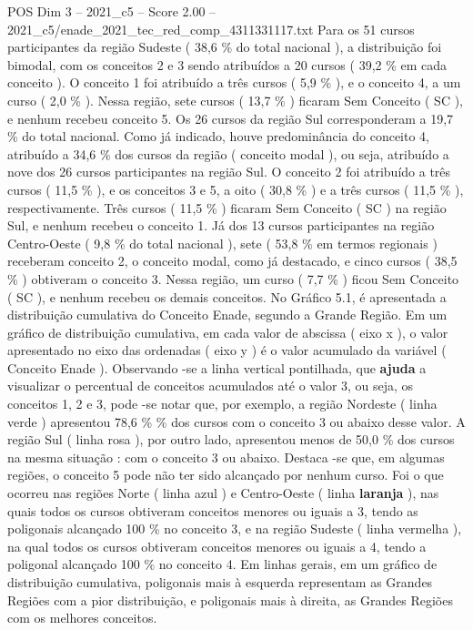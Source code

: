 \begin{textsample}{POS Dim 3 – 2021\_c5 – Score 2.00 – 2021\_c5/enade\_2021\_tec\_red\_comp\_4311331117.txt}
Para os 51 cursos participantes da região Sudeste ( 38,6 \% do total nacional ), a distribuição foi bimodal, com os conceitos 2 e 3 sendo atribuídos a 20 cursos ( 39,2 \% em cada conceito ).
O conceito 1 foi atribuído a três cursos ( 5,9 \% ), e o conceito 4, a um curso ( 2,0 \% ).
Nessa região, sete cursos ( 13,7 \% ) ficaram Sem Conceito ( SC ), e nenhum recebeu conceito 5.
Os 26 cursos da região Sul corresponderam a 19,7 \% do total nacional.
Como já indicado, houve predominância do conceito 4, atribuído a 34,6 \% dos cursos da região ( conceito modal ), ou seja, atribuído a nove dos 26 cursos participantes na região Sul.
O conceito 2 foi atribuído a três cursos ( 11,5 \% ), e os conceitos 3 e 5, a oito ( 30,8 \% ) e a três cursos ( 11,5 \% ), respectivamente.
Três cursos ( 11,5 \% ) ficaram Sem Conceito ( SC ) na região Sul, e nenhum recebeu o conceito 1.
Já dos 13 cursos participantes na região Centro-Oeste ( 9,8 \% do total nacional ), sete ( 53,8 \% em termos regionais ) receberam conceito 2, o conceito modal, como já destacado, e cinco cursos ( 38,5 \% ) obtiveram o conceito 3.
Nessa região, um curso ( 7,7 \% ) ficou Sem Conceito ( SC ), e nenhum recebeu os demais conceitos.
No Gráfico 5.1, é apresentada a distribuição cumulativa do Conceito Enade, segundo a Grande Região.
Em um gráfico de distribuição cumulativa, em cada valor de abscissa ( eixo x ), o valor apresentado no eixo das ordenadas ( eixo y ) é o valor acumulado da variável ( Conceito Enade ).
Observando -se a linha vertical pontilhada, que \textbf{ajuda} a visualizar o percentual de conceitos acumulados até o valor 3, ou seja, os conceitos 1, 2 e 3, pode -se notar que, por exemplo, a região Nordeste ( linha verde ) apresentou 78,6 \% \% dos cursos com o conceito 3 ou abaixo desse valor.
A região Sul ( linha rosa ), por outro lado, apresentou menos de 50,0 \% dos cursos na mesma situação : com o conceito 3 ou abaixo.
Destaca -se que, em algumas regiões, o conceito 5 pode não ter sido alcançado por nenhum curso.
Foi o que ocorreu nas regiões Norte ( linha azul ) e Centro-Oeste ( linha \textbf{laranja} ), nas quais todos os cursos obtiveram conceitos menores ou iguais a 3, tendo as poligonais alcançado 100 \% no conceito 3, e na região Sudeste ( linha vermelha ), na qual todos os cursos obtiveram conceitos menores ou iguais a 4, tendo a poligonal alcançado 100 \% no conceito 4.
Em linhas gerais, em um gráfico de distribuição cumulativa, poligonais mais à esquerda representam as Grandes Regiões com a pior distribuição, e poligonais mais à direita, as Grandes Regiões com os melhores conceitos.

\end{textsample}
